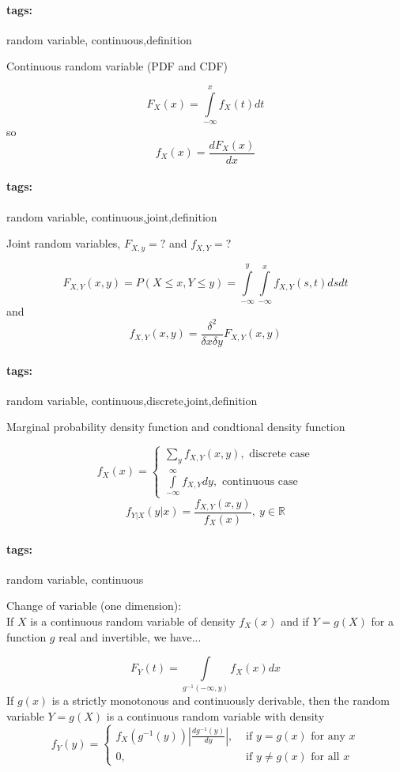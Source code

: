 \documentclass[12pt]{article}
\newcommand*{\xfield}[1]{\begin{mdframed}\centering #1\end{mdframed}\bigskip}
\newenvironment{note}{}{}
\newcommand*{\tags}[1]{\paragraph{tags: }#1}
\begin{document}
\begin{note}
	\tags{random variable, continuous,definition}
	\xfield{Continuous random variable (PDF and CDF)} %
	\xfield{$$F_X(x) = \int\limits_{-\infty}^x f_X(t) dt$$
so
$$f_X(x) = \frac{dF_X(x)}{dx}$$} %
\end{note}

\begin{note}
	\tags{random variable, continuous,joint,definition}
	\xfield{Joint random variables, $F_{X,y} = ?$ and $f_{X,Y} = ?$} %
	\xfield{$$F_{X,Y}(x,y) = P(X \le x, Y \le y) = \int\limits_{-\infty}^y
    \int\limits_{-\infty}^x f_{X,Y}(s,t)ds dt$$
    and
$$f_{X,Y}(x,y)=\frac{\delta^2}{\delta x \delta y}F_{X,Y}(x,y)$$} %
\end{note}

\begin{note}
	\tags{random variable, continuous,discrete,joint,definition}
	\xfield{Marginal probability density function and condtional density function} %
	\xfield{$$f_X(x) = \begin{cases} \sum\limits_y f_{X,Y}(x,y),\text{ discrete
        case}\\
      \int\limits_{-\infty}^{\infty}f_{X,Y}dy,\text{ continuous case}
\end{cases}$$
$$f_{Y|X}(y|x) = \frac{f_{X,Y}(x,y)}{f_X(x)},\ y \in \mathbb{R}$$} %
\end{note}

\begin{note}
	\tags{random variable, continuous}
	\xfield{Change of variable (one dimension):\\
If $X$ is a continuous random variable of density $f_X(x)$ and if
    $Y=g(X)$ for a function $g$ real and invertible, we have...} %
	\xfield{$$F_Y(t) = \int\limits_{g^{-1}(-\infty,y)}f_X(x)dx$$
If $g(x)$ is a strictly monotonous and continuously derivable, then the random
variable $Y=g(X)$ is a continuous random variable with density
$$f_Y(y) = \begin{cases}
f_X(g^{-1}(y))|\frac{d g^{-1}(y)}{dy}|, &\text{ if $y=g(x)$ for any $x$}\\
0,&\text{ if $y \neq g(x)$ for all $x$}
\end{cases}$$
    } %
\end{note}
\end{document}
